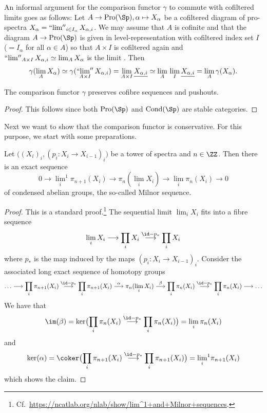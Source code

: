 \documentclass[colorinlistoftodos,article,11pt,reqno]{article}
\newcommand{\Pro}{\textup{Pro}}
\newcommand{\Cond}{\textup{Cond}}
\renewcommand{\to}[1][]{\overset{#1}{\rightarrow}}
\newcommand{\To}[1][]{\overset{#1}{\longrightarrow}}
\DeclareMathOperator*{\prolim}{``lim''}
\begin{document}
\begin{appendix}
\begin{remark} \label{continuous-comparison-lemma}
An informal argument for the comparison functor $\gamma$ to commute with cofiltered limits goes as follows:
Let $A \to \Pro(\Sp), \alpha \mapsto X_\alpha$ be a cofiltered diagram of pro-spectra $X_\alpha = \prolim_{i\in I_\alpha}X_{\alpha, i}$. We may assume that $A$ is cofinite and that the diagram $A\to\Pro(\Sp)$ is given in level-representation with cofiltered index set $I$ ($=I_\alpha$ for all $\alpha\in A$) so that $A\times I$ is cofiltered again and $\prolim_{A\times I}X_{\alpha,i} \simeq \lim_AX_\alpha$ is the limit \cite[\S 4]{isaksen-calculating}. Then
	\begin{align*}
	\gamma( \lim_{A} X_\alpha ) 
	\simeq \gamma( \prolim_{A\times I} X_{\alpha, i} ) 
	= \lim_{A\times I} \underline{X_{\alpha, i}} 
	\simeq   \lim_{A} \, \lim_{I} \underline{X_{\alpha, i}} 
	=  \lim_{A} \gamma( X_\alpha ).
	\end{align*}
\end{remark}



\begin{cor}
The comparison functor $\gamma$ preserves cofibre sequences and pushouts.
\end{cor}
\begin{proof}
This follows since both $\Pro(\Sp)$ and $\Cond(\Sp)$ are stable categories.
\end{proof}

Next we want to show that the comparison functor is conservative. For this purpose, we start with some preparations.

\begin{lemma} \label{condensed-milnor-sequence--lemma}
Let $\bigl( (X_i)_i, (p_i\colon X_i\to X_{i-1})_i \bigr)$ be a tower of spectra and $n\in\ZZ$. Then there is an exact sequence
\[
0 \To {\lim_i}^1\pi_{n+1}(X_i) \To \pi_n(\lim_iX_i) \To \lim_i\pi_n(X_i) \To 0
\]
of condensed abelian groups, the so-called Milnor sequence.
\end{lemma}
\begin{proof}
This is a standard proof.\footnote{Cf.~\url{https://ncatlab.org/nlab/show/lim^1+and+Milnor+sequences}.}
The sequential limit $\lim_iX_i$ fits into a fibre sequence
\[
\lim_i X_i \To \prod_iX_i \To[\id-p_*] \prod_iX_i
\]
where $p_*$ is the map induced by the maps $(p_i\colon X_i\to X_{i-1})_i$. Consider the associated long exact sequence of homotopy groups
\[
\ldots \To \prod_i\pi_{n+1}(X_i) \To[\id-p_*] \prod_i\pi_{n+1}(X_i) \To[\alpha] \pi_n(\lim_iX_i) \To[\beta] \prod_i\pi_n(X_i) \To[\id-p_*] \prod_i\pi_n(X_i) \To \ldots
\]
We have that
\[
\im(\beta) = \ker\bigl( \prod_i\pi_n(X_i) \To[\id-p_*] \prod_i\pi_n(X_i) \bigr) = \lim_i\pi_n(X_i)
\]
and
\[
\ker(\alpha) = \coker\bigl( \prod_i\pi_{n+1}(X_i) \To[\id-p_*] \prod_i\pi_{n+1}(X_i) \bigr) = {\lim_i}^1\pi_{n+1}(X_i)
\]
which shows the claim.
\end{proof}




\end{appendix}
\end{document}

